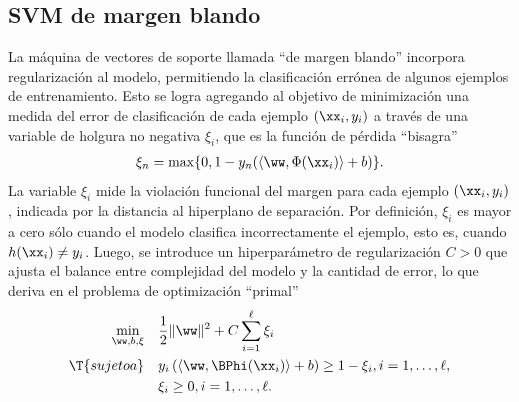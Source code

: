 %
%
\subsection{SVM de margen blando}
%
La máquina de vectores de soporte llamada ``de margen blando''
incorpora regularización al modelo, permitiendo la clasificación
errónea de algunos ejemplos de entrenamiento.
%
Esto se logra agregando al objetivo de minimización una medida del
error de clasificación de cada ejemplo $(\xx_i,y_i)$ a través de una
variable de holgura no negativa $\xi_i$, que es la función de pérdida
``bisagra''
%
\begin{align}
  \xi_n = \max\{0,1-y_n(\langle{}\ww,\Phi(\xx_i)\rangle+b)\}.
\end{align}
%
La variable $\xi_i$ mide la violación funcional del margen para cada
ejemplo $(\xx_i,y_i)$, indicada por la distancia al hiperplano de
separación.
Por definición, $\xi_i$ es mayor a cero sólo cuando el modelo
clasifica incorrectamente el ejemplo, esto es, cuando
$h(\xx_i)\neq{}y_i$.
Luego, se introduce un hiperparámetro de regularización $C>0$ que
ajusta el balance entre complejidad del modelo y la cantidad de error,
lo que deriva en el problema de optimización ``primal''
%
\begin{equation}\label{svm-primal-blando}
  \begin{aligned}
    \min_{\ww,b,\xi} \quad & \frac{1}{2}\|\ww\|^2+C\sum_{i=1}^{\ell}\xi_i\\
    \T{sujeto a} \quad &
    y_i\left(\langle{}\ww,\BPhi(\xx_i)\rangle+b\right) \geq 1-\xi_i, i=1,\ldots,\ell, \\
    & \xi_i \geq 0, i=1,\ldots,\ell.
  \end{aligned}
\end{equation}
%
%

